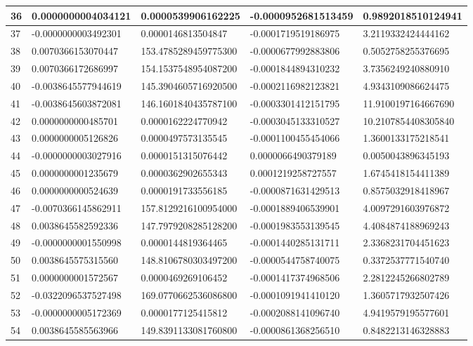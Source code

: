 \begin{center}
\begin{longtable}{|p{0.5cm}|p{3.5cm}|p{3.5cm}|p{3.5cm}|p{3.5cm}|}
\hline
36  & 0.0000000004034121  & 0.0000539906162225  & -0.0000952681513459  & 0.9892018510124941\\
\hline
37  & -0.0000000003492301  & 0.0000146813504847  & -0.0001719519186975  & 3.2119332424444162\\
\hline
38  & 0.0070366153070447  & 153.4785289459775300  & -0.0000677992883806  & 0.5052758255376695\\
\hline
39  & 0.0070366172686997  & 154.1537548954087200  & -0.0001844894310232  & 3.7356249240880910\\
\hline
40  & -0.0038645577944619  & 145.3904605716920500  & -0.0002116982123821  & 4.9343109086624475\\
\hline
41  & -0.0038645603872081  & 146.1601840435787100  & -0.0003301412151795  & 11.9100197164667690\\
\hline
42  & 0.0000000000485701  & 0.0000162224770942  & -0.0003045133310527  & 10.2107854408305840\\
\hline
43  & 0.0000000005126826  & 0.0000497573135545  & -0.0001100455454066  & 1.3600133175218541\\
\hline
44  & -0.0000000003027916  & 0.0000151315076442  & 0.0000066490379189  & 0.0050043896345193\\
\hline
45  & 0.0000000001235679  & 0.0000362902655343  & 0.0001219258727557  & 1.6745418154411389\\
\hline
46  & 0.0000000000524639  & 0.0000191733556185  & -0.0000871631429513  & 0.8575032918418967\\
\hline
47  & -0.0070366145862911  & 157.8129216100954000  & -0.0001889406539901  & 4.0097291603976872\\
\hline
48  & 0.0038645582592336  & 147.7979208285128200  & -0.0001983553139545  & 4.4084874188969243\\
\hline
49  & -0.0000000001550998  & 0.0000144819364465  & -0.0001440285131711  & 2.3368231704451623\\
\hline
50  & 0.0038645575315560  & 148.8106780303497200  & -0.0000544758740075  & 0.3372537771540740\\
\hline
51  & 0.0000000001572567  & 0.0000469269106452  & -0.0001417374968506  & 2.2812245266802789\\
\hline
52  & -0.0322096537527498  & 169.0770662536086800  & -0.0001091941410120  & 1.3605717932507426\\
\hline
53  & -0.0000000005172369  & 0.0000177125415812  & -0.0002088141096740  & 4.9419579195577601\\
\hline
54  & 0.0038645585563966  & 149.8391133081760800  & -0.0000861368256510  & 0.8482213146328883\\

\end{longtable}
\end{center}

